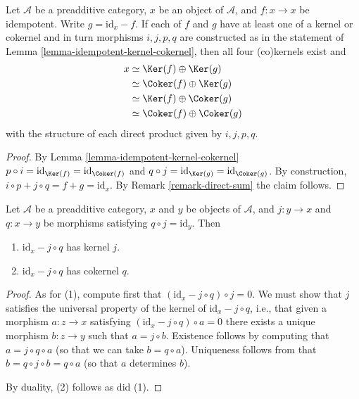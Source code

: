 \begin{lemma}
\label{lemma-idempotent-splitting}
Let $\mathcal{A}$ be a preadditive category,
$x$ be an object of $\mathcal{A}$,
and $f : x \to x$ be idempotent.
Write $g = \text{id} _ x - f$.
If each of $f$ and $g$ have at least one of a kernel or cokernel
and in turn morphisms $i , j , p , q$ are constructed
as in the statement of Lemma \ref{lemma-idempotent-kernel-cokernel},
then all four (co)kernels exist and
\begin{align*}
x
& \simeq \Ker (f) \oplus \Ker (g) \\
& \simeq \Coker (f) \oplus \Ker (g) \\
& \simeq \Ker (f) \oplus \Coker (g) \\
& \simeq \Coker (f) \oplus \Coker (g)
\end{align*}
with the structure of each direct product given by $i , j , p , q$.
\end{lemma}

\begin{proof}
By Lemma \ref{lemma-idempotent-kernel-cokernel}
$p \circ i = \text{id} _ {\Ker (f)} = \text{id} _ {\Coker (f)}$
and $q \circ j = \text{id} _ {\Ker (g)} = \text{id} _ {\Coker (g)}$.
By construction, $i \circ p + j \circ q = f + g = \text{id} _ x$.
By Remark \ref{remark-direct-sum} the claim follows.
\end{proof}

\begin{lemma}
\label{lemma-split-morphism-kernel-cokernel}
Let $\mathcal{A}$ be a preadditive category,
$x$ and $y$ be objects of $\mathcal{A}$,
and $j : y \to x$ and $q : x \to y$ be morphisms
satisfying $q \circ j = \text{id} _ y$.
Then
\begin{enumerate}
\item $\text{id} _ x - j \circ q$ has kernel $j$.
\item $\text{id} _ x - j \circ q$ has cokernel $q$.
\end{enumerate}
\end{lemma}

\begin{proof}
As for (1), compute first that $(\text{id} _ x - j \circ q) \circ j = 0$.
We must show that $j$ satisfies the universal property
of the kernel of $\text{id} _ {x} - j \circ q$,
i.e., that given a morphism $a : z \to x$
satisfying $(\text{id} _ x - j \circ q) \circ a = 0$
there exists a unique morphism $b : z \to y$
such that $a = j \circ b$.
Existence follows by computing that $a = j \circ q \circ a$
(so that we can take $b = q \circ a$).
Uniqueness follows from that $b = q \circ j \circ b = q \circ a$
(so that $a$ determines $b$).

\medskip\noindent
By duality, (2) follows as did (1).
\end{proof}

